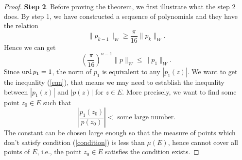 \begin{proof}
\textbf{Step 2}. Before proving the theorem, we first illustrate what the step 2 does. By step 1, we have constructed a sequence of polynomials and they have the relation
\[
\|p_{k-1}\|_{W}\ge \frac{\pi}{16}\|p_k\|_{W}
.\]
Hence we can get 
 \[
   \left( \frac{\pi}{16} \right) ^{n-1}\|p\|_W\le \|p_1\|_W.
\] 
Since $\operatorname{ord} p_1=1$, the norm of $p_1$ is equivalent to any $\left| p_1(z) \right| $. We want to get the inequality (\ref{eqn}), that means we may need to establish the inequality between $|p_1(z)|$ and  $|p(z)|$ for $z\in E$. More precisely, we want to find some point $z_0\in E$
such that
\begin{equation} 
  \left| \frac{p_1(z_0)}{p(z_0)} \right|< \text{ some large number} \label{condition}.
\end{equation} 
The constant can be chosen large enough so that the measure of points which don't satisfy condition (\ref{condition}) is less than $\mu(E)$, hence cannot cover all points of $E$, i.e., the point $z_0\in E$ satisfies the condition exists.


\end{proof}
